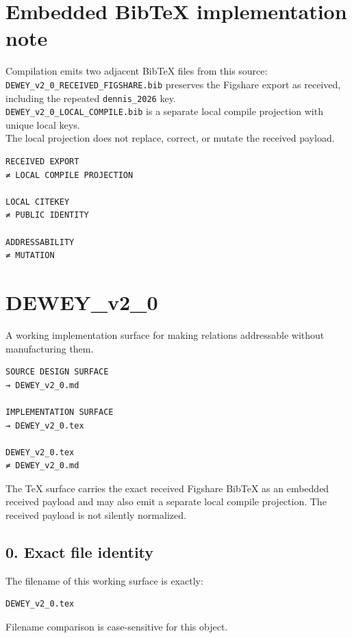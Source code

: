 \section*{Embedded BibTeX implementation note}
Compilation emits two adjacent BibTeX files from this source:\\
\texttt{DEWEY\_v2\_0\_RECEIVED\_FIGSHARE.bib} preserves the Figshare export as received, including the repeated \texttt{dennis\_2026} key.\\
\texttt{DEWEY\_v2\_0\_LOCAL\_COMPILE.bib} is a separate local compile projection with unique local keys.\\
The local projection does not replace, correct, or mutate the received payload.

\begin{verbatim}
RECEIVED EXPORT
≠ LOCAL COMPILE PROJECTION

LOCAL CITEKEY
≠ PUBLIC IDENTITY

ADDRESSABILITY
≠ MUTATION
\end{verbatim}

\section{DEWEY\_v2\_0}\label{dewey_v2_0}

A working implementation surface for making relations addressable
without manufacturing them.

\begin{verbatim}
SOURCE DESIGN SURFACE
→ DEWEY_v2_0.md

IMPLEMENTATION SURFACE
→ DEWEY_v2_0.tex

DEWEY_v2_0.tex
≠ DEWEY_v2_0.md
\end{verbatim}

The TeX surface carries the exact received Figshare BibTeX as an
embedded received payload and may also emit a separate local compile
projection. The received payload is not silently normalized.

\subsection{0. Exact file identity}\label{exact-file-identity}

The filename of this working surface is exactly:

\begin{verbatim}
DEWEY_v2_0.tex
\end{verbatim}

Filename comparison is case-sensitive for this object.

